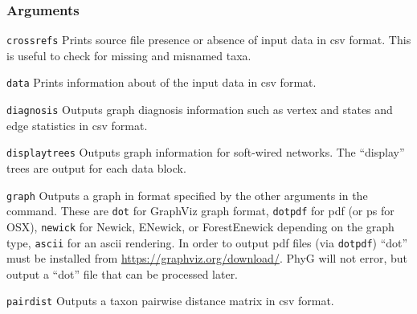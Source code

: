 \documentclass[11pt]{article}
\begin{document}
		\subsubsection{Arguments}
				\noindent \texttt{crossrefs} Prints source file presence or absence of input data in csv format.  This is useful to check for 
				missing and misnamed taxa.
			
				\smallskip
				\noindent \texttt{data} Prints information about of the input data in csv format.
				
				\smallskip
				\noindent \texttt{diagnosis}  Outputs graph diagnosis information such as vertex and states and edge statistics in csv format. 
			
				\smallskip
				\noindent \texttt{displaytrees}  Outputs graph information for soft-wired networks.  The ``display'' trees are output for each data block. 
				
				\smallskip
				\noindent \texttt{graph} Outputs a graph in format specified by the other arguments in the command.  These are \texttt{dot} for GraphViz graph format, \texttt{dotpdf} for pdf (or ps for OSX), 
				\texttt{newick} for Newick, ENewick, or ForestEnewick depending on the graph type, \texttt{ascii} for an ascii rendering.  In  order to output pdf files (via \texttt{dotpdf}) ``dot'' must be installed from \url{https://graphviz.org/download/}.  PhyG will not error, but output a ``dot'' file that can be processed later.
				
				\smallskip
				\noindent \texttt{pairdist} Outputs a taxon pairwise distance matrix in csv format.  
				
\end{document}
